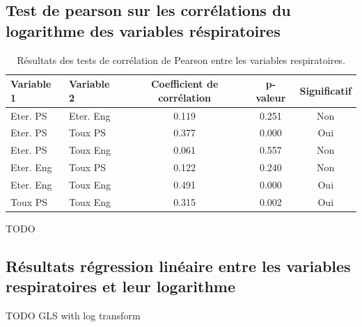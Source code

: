 \documentclass{article}
\begin{document}
\subsection{Test de pearson sur les corrélations du logarithme des variables réspiratoires}\label{annexe:pearson}
\begin{table}[ht]
    \centering
    \begin{tabular}{llccc}
    \toprule
    \textbf{Variable 1} & \textbf{Variable 2} & \textbf{Coefficient de corrélation} & \textbf{p-valeur} & \textbf{Significatif} \\
    \midrule
    Eter. PS & Eter. Eng & 0.119 & 0.251 & Non \\
    Eter. PS & Toux PS & 0.377 & 0.000 & Oui \\
    Eter. PS & Toux Eng & 0.061 & 0.557 & Non \\
    Eter. Eng & Toux PS & 0.122 & 0.240 & Non \\
    Eter. Eng & Toux Eng & 0.491 & 0.000 & Oui \\
    Toux PS & Toux Eng & 0.315 & 0.002 & Oui \\
    \bottomrule
    \end{tabular}
    \caption{Résultats des tests de corrélation de Pearson entre les variables respiratoires.}\label{tab:correlation_results}
\end{table}
TODO


\subsection{Résultats régression linéaire entre les variables respiratoires et leur logarithme}
TODO GLS with log transform 
\end{document}
